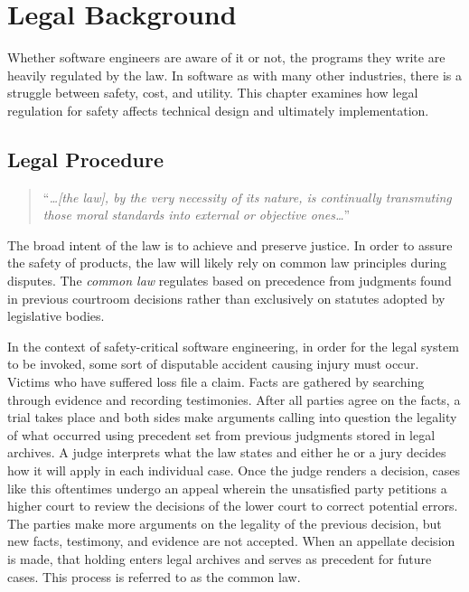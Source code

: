 \documentclass[12pt]{report}
\begin{document}
\chapter{Legal Background} 

Whether software engineers are aware of it or not, the programs they write are heavily regulated by the law. In software as with many other industries, there is a struggle between safety, cost, and utility. This chapter examines how legal regulation for safety affects technical design and ultimately implementation.

\section{Legal Procedure} 

\begin{quote}
``\textit{\ldots [the law], by the very necessity of its nature, is continually transmuting those moral standards into external or objective ones\ldots}''
\end{quote}

The broad intent of the law is to achieve and preserve justice. In order to assure the safety of products, the law will likely rely on common law principles during disputes. The \textit{common law} regulates based on precedence from judgments found in previous courtroom decisions rather than exclusively on statutes adopted by legislative bodies. 

In the context of safety-critical software engineering, in order for the legal system to be invoked, some sort of disputable accident causing injury must occur. Victims who have suffered loss file a claim. Facts are gathered by searching through evidence and recording testimonies. After all parties agree on the facts, a trial takes place and both sides make arguments calling into question the legality of what occurred using precedent set from previous judgments stored in legal archives. A judge interprets what the law states and either he or a jury decides how it will apply in each individual case. Once the judge renders a decision, cases like this oftentimes undergo an appeal wherein the unsatisfied party petitions a higher court to review the decisions of the lower court to correct potential errors. The parties make more arguments on the legality of the previous decision, but new facts, testimony, and evidence are not accepted. When an appellate decision is made, that holding enters legal archives and serves as precedent for future cases. This process is referred to as the common law. 
\end{document}
